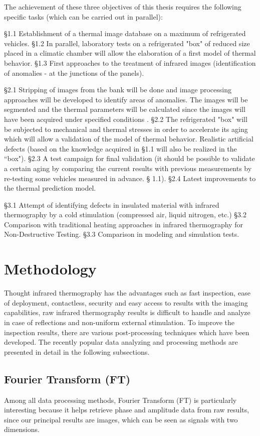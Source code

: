 The achievement of these three objectives of this thesis requires the following specific tasks (which can be carried out in parallel):

\S 1.1 Establishment of a thermal image database on a maximum of refrigerated vehicles. §1.2 In parallel, laboratory tests on a refrigerated "box" of reduced size placed in a climatic chamber will allow the elaboration of a first model of thermal behavior. §1.3 First approaches to the treatment of infrared images (identification of anomalies - at the junctions of the panels).

\S 2.1 Stripping of images from the bank will be done and image processing approaches will be developed to identify areas of anomalies. The images will be segmented and the thermal parameters will be calculated since the images will have been acquired under specified conditions \citep{Ibarra-Castanedo2013Methods}. §2.2 The refrigerated "box" will be subjected to mechanical and thermal stresses in order to accelerate its aging which will allow a validation of the model of thermal behavior. Realistic artificial defects (based on the knowledge acquired in §1.1 will also be realized in the ``box"). §2.3 A test campaign for final validation (it should be possible to validate a certain aging by comparing the current results with previous measurements by re-testing some vehicles measured in advance. § 1.1). §2.4 Latest improvements to the thermal prediction model.

\S 3.1 Attempt of identifying defects in insulated material with infrared thermography by a cold stimulation (compressed air, liquid nitrogen, etc.) \S 3.2 Comparison with traditional heating approaches in infrared thermography for Non-Destructive Testing. \S 3.3 Comparison in modeling and simulation tests.

\section{Methodology}
Thought infrared thermography has the advantages such as fast inspection, ease of deployment, contactless, security and easy access to results with the imaging capabilities, raw infrared thermography results is difficult to handle and analyze in case of reflections and non-uniform external stimulation. To improve the inspection results, there are various post-processing techniques which have been developed. The recently popular data analyzing and processing methods are presented in detail in the following subsections.
\subsection{Fourier Transform (FT)}
Among all data processing methods, Fourier Transform (FT) is particularly interesting because it helps retrieve phase and amplitude data from raw results, since our principal results are images, which can be seen as signals with two dimensions.

